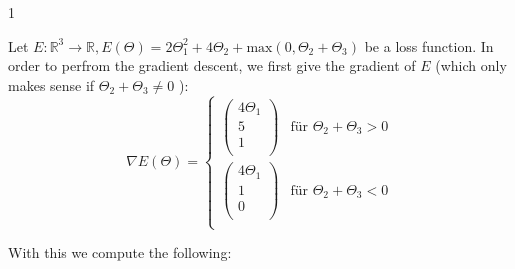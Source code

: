 \documentclass{article}
\begin{document}
    \begin{ukon-infie}[12.11.17]{1}

		
		\begin{exercise}[p=20]{}
        	
		\end{exercise}
		
		\begin{exercise}[p=10]{}
        	
		\end{exercise}
		
		\begin{exercise}[p=10]{}
        	
		\end{exercise}
		
		\begin{exercise}[p=10]{}
        	
		\end{exercise}
		
		\begin{exercise}[p=10]{}
        	
		\end{exercise}
		
		\begin{exercise}[p=10]{}
        	Let $E: \mathbb{R}^3 \rightarrow \mathbb{R}, E(\Theta) = 2\Theta_1^2 + 4\Theta_2 + \text{max}(0, \Theta_2 + \Theta_3)$ be a loss function. In order to perfrom the gradient descent, we first give the gradient of $E$ (which only makes sense if $\Theta_2 + \Theta_3 \not = 0$ ): 
\begin{equation}
\nabla E(\Theta) =
\begin{cases}
\left(
\begin{array}{c}
4 \Theta_1\\
5\\
1\\
\end{array}
\right) & \text{für } \Theta_2 + \Theta_3 > 0 \\
 \left(
\begin{array}{c}
4\Theta_1\\
1\\
0\\
\end{array}
\right) & \text{für } \Theta_2 + \Theta_3 < 0\\
\end{cases}
\end{equation}

With this we compute the following:\\


\end{exercise}
\end{ukon-infie}
\end{document}
